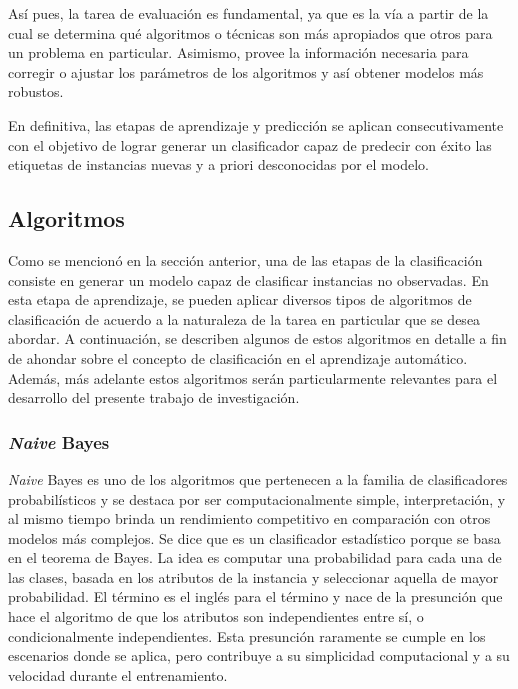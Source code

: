 Así pues, la tarea de evaluación es fundamental, ya que es la vía a partir de la
cual se determina qué algoritmos o técnicas son más apropiados que otros para un
problema en particular. Asimismo, provee la información necesaria para corregir
o ajustar los parámetros de los algoritmos y así obtener modelos más robustos.

En definitiva, las etapas de aprendizaje y predicción se aplican
consecutivamente con el objetivo de lograr generar un clasificador capaz de
predecir con éxito las etiquetas de instancias nuevas y a priori desconocidas
por el modelo.

\subsection{Algoritmos}
\label{clasificacion_algoritmos}

Como se mencionó en la sección anterior, una de las etapas de la clasificación
consiste en generar un modelo capaz de clasificar instancias no observadas. En
esta etapa de aprendizaje, se pueden aplicar diversos tipos de algoritmos de
clasificación de acuerdo a la naturaleza de la tarea en particular que se desea
abordar. A continuación, se describen algunos de estos algoritmos en detalle a
fin de ahondar sobre el concepto de clasificación en el aprendizaje automático.
Además, más adelante estos algoritmos serán particularmente relevantes para el
desarrollo del presente trabajo de investigación.

\subsubsection{\textit{Naive} Bayes}

\textit{Naive} Bayes es uno de los algoritmos que pertenecen a la familia de
clasificadores probabilísticos y se destaca por ser computacionalmente simple,
interpretación, y al mismo tiempo brinda un  rendimiento competitivo en
comparación con otros modelos más complejos. Se dice que es un clasificador
estadístico porque se basa en el teorema de Bayes. La idea es computar una
probabilidad para cada una de las clases, basada en los atributos de la
instancia y seleccionar aquella de mayor probabilidad. El término
 es el inglés para el término
 y nace de la presunción que hace el algoritmo de que
los atributos son independientes entre sí, o condicionalmente independientes.
Esta presunción raramente se cumple en los escenarios donde se aplica, pero
contribuye a su simplicidad computacional y a su velocidad durante el
entrenamiento.

